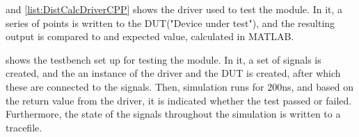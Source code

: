  and \cref{list:DistCalcDriverCPP} shows the driver used to test the module. In it, a series of points is written to the DUT("Device under test"), and the resulting output is compared to and expected value, calculated in MATLAB.

 shows the testbench set up for testing the module. In it, a set of signals is created, and the an instance of the driver and the DUT is created, after which these are connected to the signals. Then, simulation runs for 200ns, and based on the return value from the driver, it is indicated whether the test passed or failed. Furthermore, the state of the signals throughout the simulation is written to a tracefile.







